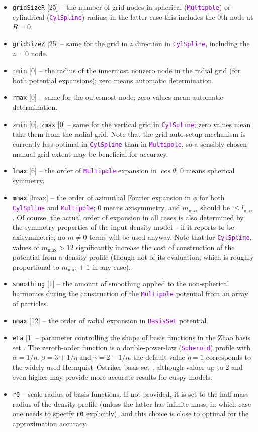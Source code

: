 \documentclass[12pt]{article}
\newcommand{\ttt}[1]{\textcolor{darkviolet}{\texttt{#1}}}
\newcommand{\ppp}[1]{\textcolor{darkolive} {\texttt{#1}}}
\begin{document}
\begin{itemize}
\item \ppp{gridSizeR} [25] -- the number of grid nodes in spherical (\ttt{Multipole}) or cylindrical (\ttt{CylSpline}) radius; in the latter case this includes the 0th node at $R=0$. 
\item \ppp{gridSizeZ} [25] -- same for the grid in $z$ direction in \ttt{CylSpline}, including the $z=0$ node.
\item \ppp{rmin} [0] -- the radius of the innermost nonzero node in the radial grid (for both potential expansions); zero means automatic determination.
\item \ppp{rmax} [0] -- same for the outermost node; zero values mean automatic determination.
\item \ppp{zmin} [0], \ppp{zmax} [0] -- same for the vertical grid in \ttt{CylSpline}; zero values mean take them from the radial grid. Note that the grid auto-setup mechanism is currently less optimal in \ttt{CylSpline} than in \ttt{Multipole}, so a sensibly chosen manual grid extent may be beneficial for accuracy.
\item \ppp{lmax} [6] -- the order of \ttt{Multipole} expansion in $\cos\theta$; 0 means spherical symmetry. 
\item \ppp{mmax} [lmax] -- the order of azimuthal Fourier expansion in $\phi$ for both  \ttt{CylSpline} and \ttt{Multipole}; 0 means axisymmetry, and $m_\mathrm{max}$ should be $\le l_\mathrm{max}$. Of course, the actual order of expansion in all cases is also determined by the symmetry properties of the input density model -- if it reports to be axisymmetric, no $m\ne 0$ terms will be used anyway. Note that for \ttt{CylSpline}, values of $m_\mathrm{max}>12$ significantly increase the cost of construction of the potential from a density profile (though not of its evaluation, which is roughly proportional to $m_\mathrm{max}+1$ in any case).
\item \ppp{smoothing} [1] -- the amount of smoothing applied to the non-spherical harmonics during the construction of the \ttt{Multipole} potential from an array of particles.
\item \ppp{nmax} [12] -- the order of radial expansion in \ttt{BasisSet} potential.
\item \ppp{eta} [1] -- parameter controlling the shape of basis functions in the Zhao basis set \cite{Zhao1996}. The zeroth-order function is a double-power-law (\ttt{Spheroid}) profile with $\alpha=1/\eta$, $\beta=3+1/\eta$ and $\gamma=2-1/\eta$; the default value $\eta=1$ corresponds to the widely used Hernquist--Ostriker basis set \cite{HernquistOstriker1992}, although values up to 2 and even higher may provide more accurate results for cuspy models.
\item \ppp{r0} -- scale radius of basis functions. If not provided, it is set to the half-mass radius of the density profile (unless the latter has infinite mass, in which case one needs to specify \ppp{r0} explicitly), and this choice is close to optimal for the approximation accuracy.
\end{itemize}
\end{document}
